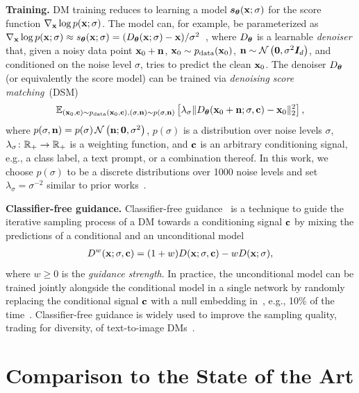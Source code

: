 \documentclass{article}
\begin{document}
\textbf{Training.} 
DM training reduces to learning a model ${\bm{s}}_{\bm{\theta}}({\mathbf{x}}; \sigma)$ for the score function $\nabla_{\mathbf{x}} \log p({\mathbf{x}}; \sigma)$. 
The model can, for example, be parameterized as $\nabla_{\mathbf{x}} \log p({\mathbf{x}}; \sigma) \approx s_{\bm{\theta}}({\mathbf{x}}; \sigma) = (D_{\bm{\theta}}({\mathbf{x}}; \sigma) - {\mathbf{x}})/ \sigma^2$~\citep{karras2022elucidating}, where $D_{\bm{\theta}}$ is a learnable \emph{denoiser} that, given a noisy data point ${\mathbf{x}}_0 + {\mathbf{n}}$, ${\mathbf{x}}_0 \sim p_{\rm{data}}({\mathbf{x}}_0)$, ${\mathbf{n}} \sim {\mathcal{N}}\left(\bm{0}, \sigma^2 {\bm{I}}_d\right)$, and conditioned on the noise level $\sigma$, tries to predict the clean ${\mathbf{x}}_0$. 
The denoiser $D_{\bm{\theta}}$ (or equivalently the score model) can be trained via \emph{denoising score matching}~(DSM)
%
\begin{align} \label{eq:diffusion_objective}
    \mathbb{E}_{\substack{({\mathbf{x}}_0, {\mathbf{c}}) \sim p_{\rm{data}}({\mathbf{x}}_0, {\mathbf{c}}), (\sigma, {\mathbf{n}}) \sim p(\sigma, {\mathbf{n}})}} \left[\lambda_\sigma \|D_{\bm{\theta}}({\mathbf{x}}_0 + {\mathbf{n}}; \sigma, {\mathbf{c}}) - {\mathbf{x}}_0 \|_2^2 \right],
\end{align}
%
where $p(\sigma, {\mathbf{n}}) = p(\sigma)\,{\mathcal{N}}\left({\mathbf{n}}; \bm{0}, \sigma^2\right)$, $p(\sigma)$ is a distribution over noise levels $\sigma$, $\lambda_\sigma \colon \mathbb{R}_+ \to \mathbb{R}_+$ is a weighting function, and ${\mathbf{c}}$ is an arbitrary conditioning signal, e.g., a class label, a text prompt, or a combination thereof. In this work, we choose $p(\sigma)$ to be a discrete distributions over 1000 noise levels and set $\lambda_\sigma = \sigma^{-2}$ similar to prior works~\cite{ho2020denoising,rombach2021high,sohl2015deep}.

\textbf{Classifier-free guidance.} Classifier-free guidance~\citep{ho2022classifier} is a technique to guide the iterative sampling process of a DM towards a conditioning signal ${\mathbf{c}}$ by mixing the predictions of a conditional and an unconditional model
%
\begin{align} \label{eq:guidance}
    D^w({\mathbf{x}}; \sigma, {\mathbf{c}}) = (1 + w) D({\mathbf{x}}; \sigma,{\mathbf{c}}) - w D({\mathbf{x}}; \sigma),
\end{align}
%
where $w \geq 0$ is the \emph{guidance strength}. In practice, the unconditional model can be trained  jointly alongside the conditional model in a single network by randomly replacing the conditional signal ${\mathbf{c}}$ with a null embedding in~, e.g., 10\% of the time~\citep{ho2022classifier}. Classifier-free guidance is widely used to improve the sampling quality, trading for diversity, of text-to-image DMs~\citep{nichol2021glide, rombach2021high}.

\clearpage
%
\section{Comparison to the State of the Art}
%
\comparetoif
\end{document}
